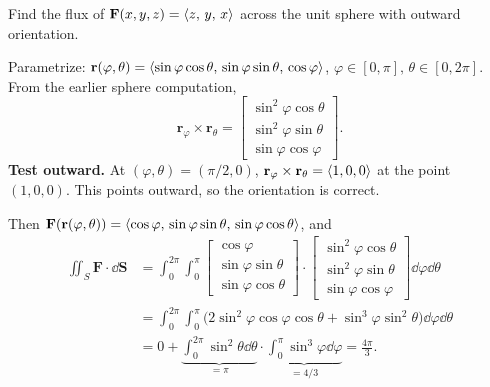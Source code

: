 \begin{example}
  Find the flux of $\mathbf{F}(x,y,z) = \langle z,\,y,\,x \rangle$ across the unit sphere with outward orientation.

  Parametrize: $\mathbf{r}(\varphi,\theta) = \langle \sin\varphi\cos\theta,\,\sin\varphi\sin\theta,\,\cos\varphi \rangle$,
  $\varphi\in[0,\pi],\,\theta\in[0,2\pi]$. From the earlier sphere computation,
  \[
    \mathbf{r}_\varphi\times\mathbf{r}_\theta =
    \begin{bmatrix}
      \sin^2\varphi\cos\theta \\
      \sin^2\varphi\sin\theta \\
      \sin\varphi\cos\varphi
    \end{bmatrix}
    .
  \]
  \textbf{Test outward.} At $(\varphi,\theta) = (\pi/2,0)$, $\mathbf{r}_\varphi\times\mathbf{r}_\theta = \langle 1,0,0 \rangle$
  at the point $(1,0,0)$. This points outward, so the orientation is correct.

  Then $\mathbf{F}(\mathbf{r}(\varphi,\theta)) = \langle \cos\varphi,\,\sin\varphi\sin\theta,\,\sin\varphi\cos\theta \rangle$, and
  \begin{align*}
    \iint_S \mathbf{F}\cdot\dd{\mathbf{S}}
     & = \int_0^{2\pi}\!\int_0^{\pi}
    \begin{bmatrix}
      \cos\varphi           \\
      \sin\varphi\sin\theta \\
      \sin\varphi\cos\theta
    \end{bmatrix}
    \cdot
    \begin{bmatrix}
      \sin^2\varphi\cos\theta \\
      \sin^2\varphi\sin\theta \\
      \sin\varphi\cos\varphi
    \end{bmatrix}
    \dd{\varphi}\dd{\theta}                                                   \\
     & = \int_0^{2\pi}\!\int_0^{\pi}\bigl(2\sin^2\varphi\cos\varphi\cos\theta
    + \sin^3\varphi\sin^2\theta\bigr)\dd{\varphi}\dd{\theta}                  \\
     & = 0 + \underbrace{\int_0^{2\pi}\sin^2\theta\dd{\theta}}_{=\pi}
    \cdot\underbrace{\int_0^{\pi}\sin^3\varphi\dd{\varphi}}_{=4/3}
    = \frac{4\pi}{3}.
  \end{align*}
\end{example}

